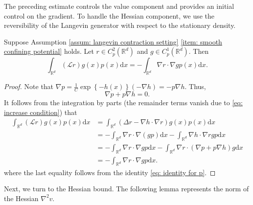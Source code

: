 \documentclass[twoside,11pt]{article}
\newcommand{\dd}{\mathrm{d}}
\newcommand{\R}{\mathbb{R}}
\newcommand{\1}{\mathbf{1}}
\newcommand{\cL}{\mathcal{L}}
\numberwithin{equation}{section}
\begin{document}
The preceding estimate controls the value component and provides an initial control on the gradient. To handle the Hessian component, we use the reversibility of the Langevin generator with respect to the stationary density.

\begin{lemma}\label{lemma: int by parts}
Suppose Assumption \ref{assum: langevin contraction setting} \eqref{item: smooth confining potential} holds. Let $r\in C^2_p(\R^d)$ and $g\in C^1_p(\R^d)$.  Then
    \begin{equation}
        \int_{\R^d} (\cL r) g(x) p(x) \dd x = -\int_{\R^d}\nabla r\cdot \nabla g p(x) \dd x.
    \end{equation}
\end{lemma}
\begin{proof}
Note that $ \nabla p = \frac{1}{C}\exp\left\{ -h(x)\right\} (-\nabla h) = -p\nabla h$. Thus,
\begin{equation}\label{eq: identity for p}
    \nabla p + p\nabla h = 0.
\end{equation}
    It follows from the integration by parts (the remainder terms vanish due to \eqref{eq: increase condition}) that
    \begin{equation}
        \begin{aligned}
            \int_{\R^d}(\cL r) g(x) p(x) \dd x &= \int_{\R^d} (\Delta r - \nabla h \cdot\nabla r) g(x) p(x) \dd x\\
            & = -\int_{\R^d} \nabla r \cdot \nabla (gp) \dd x - \int_{\R^d}\nabla h \cdot\nabla r g p \dd x\\
            & = -\int_{\R^d}\nabla r\cdot\nabla g p\dd x - \int_{\R^d} \nabla r\cdot (\nabla p + p\nabla h)g \dd x\\
            & = -\int_{\R^d} \nabla r\cdot \nabla g p\dd x.
        \end{aligned}
    \end{equation}
    where the last equality follows from the identity \eqref{eq: identity for p}.
\end{proof}
Next, we turn to the Hessian bound. The following lemma represents the norm of the Hessian $ \nabla^2 v$.
\end{document}
